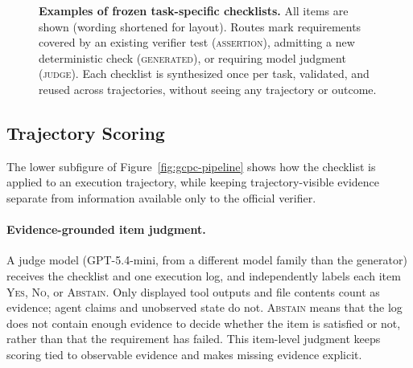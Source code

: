 \documentclass[sigconf,nonacm]{acmart}
\newcommand{\abstain}{\textsc{Abstain}}
\begin{document}
\begin{figure}[t]
\begin{minipage}[t]{0.487\textwidth}
\begin{tcolorbox}
\begin{tabularx}{\linewidth}{
  @{}
  >{\raggedright\arraybackslash}p{0.12\linewidth}
  >{\raggedright\arraybackslash}X
  >{\raggedleft\arraybackslash}p{0.23\linewidth}
  @{}
}
\end{tabularx}
\end{tcolorbox}
\end{minipage}

\caption{\textbf{Examples of frozen task-specific checklists.}
All items are shown (wording shortened for layout). Routes mark requirements
covered by an existing verifier test (\textsc{assertion}), admitting a new
deterministic check (\textsc{generated}), or requiring model judgment
(\textsc{judge}). Each checklist is synthesized once per task, validated, and
reused across trajectories, without seeing any trajectory or outcome.}
\label{fig:checklist-examples}
\end{figure}
\subsection{Trajectory Scoring}
\label{sec:scoring}

The lower subfigure of Figure~\ref{fig:gcpc-pipeline} shows how the checklist is applied to an execution trajectory, while keeping trajectory-visible evidence separate from information available only to the official verifier.

\paragraph{Evidence-grounded item judgment.}
A judge model (GPT-5.4-mini, from a different model family than the generator)
receives the checklist and one execution log, and independently labels
each item \textsc{Yes}, \textsc{No}, or \abstain{}. Only displayed tool
outputs and file contents count as evidence; agent claims and unobserved state
do not. \abstain{} means that the log does not contain enough evidence to decide whether the item is satisfied or not, rather than that the requirement has failed. This item-level judgment keeps scoring tied to observable evidence and makes missing evidence explicit.
\end{document}
